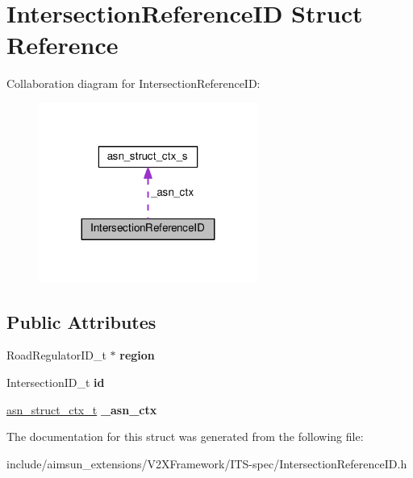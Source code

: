 \hypertarget{structIntersectionReferenceID}{}\section{Intersection\+Reference\+ID Struct Reference}
\label{structIntersectionReferenceID}


Collaboration diagram for Intersection\+Reference\+ID\+:\nopagebreak
\begin{figure}[H]
\begin{center}
\leavevmode
\includegraphics[width=203pt]{structIntersectionReferenceID__coll__graph}
\end{center}
\end{figure}
\subsection*{Public Attributes}
\begin{DoxyCompactItemize}
\item 
Road\+Regulator\+I\+D\+\_\+t $\ast$ {\bfseries region}\hypertarget{structIntersectionReferenceID_a49423f4e0faa275a9e3ec382f471fd26}{}\label{structIntersectionReferenceID_a49423f4e0faa275a9e3ec382f471fd26}

\item 
Intersection\+I\+D\+\_\+t {\bfseries id}\hypertarget{structIntersectionReferenceID_a28b050929fd0ccbbc4aba116ec11c847}{}\label{structIntersectionReferenceID_a28b050929fd0ccbbc4aba116ec11c847}

\item 
\hyperlink{structasn__struct__ctx__s}{asn\+\_\+struct\+\_\+ctx\+\_\+t} {\bfseries \+\_\+asn\+\_\+ctx}\hypertarget{structIntersectionReferenceID_a8cfc7d9236a729a785eddc602906676f}{}\label{structIntersectionReferenceID_a8cfc7d9236a729a785eddc602906676f}

\end{DoxyCompactItemize}


The documentation for this struct was generated from the following file\+:\begin{DoxyCompactItemize}
\item 
include/aimsun\+\_\+extensions/\+V2\+X\+Framework/\+I\+T\+S-\/spec/Intersection\+Reference\+I\+D.\+h\end{DoxyCompactItemize}
